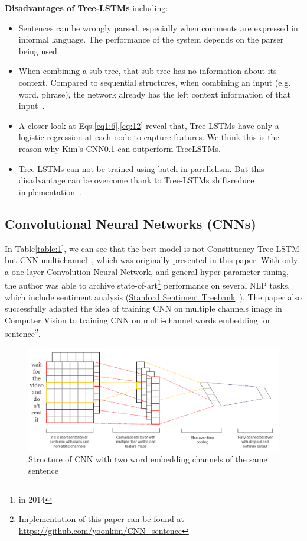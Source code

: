 \textbf{Disadvantages of Tree-LSTMs} including:\label{treelstm-drawback}
\begin{itemize}
\item Sentences can be wrongly parsed, especially when comments are expressed in informal language.
The performance of the system depends on the parser being used.
\item When combining a sub-tree, that sub-tree has no information about its context. 
Compared to sequential structures, when combining an input (e.g. word, phrase), the network already has the left context information of that input~\cite{shift-reduce}.
\item A closer look at Eqs.\eqref{eq1:6},\eqref{eq:12} reveal that, Tree-LSTMs have only a logistic regression at each node to capture features.
We think this is the reason why Kim's CNN\ref{kim-cnn} can outperform TreeLSTMs.  
\item Tree-LSTMs can not be trained using batch in parallelism. But this disadvantage can be overcome thank to Tree-LSTMs shift-reduce implementation~\cite{shift-reduce}.
\end{itemize}


\subsection{Convolutional Neural Networks (CNNs)}\label{kim-cnn}
In Table\ref{table:1}, we can see that the best model is not Constituency Tree-LSTM but CNN-multichannel~\cite{KimCNN}, which was originally presented in this paper. 
With only a one-layer \hyperref[sec:cnn]{Convolution Neural Network}, and general hyper-parameter tuning, the author was able to archive state-of-art\footnote{in 2014} performance on several NLP tasks, which include sentiment analysis (\hyperref[sec:sst]{Stanford Sentiment Treebank}~\cite{socher2013recursive}). 
The paper also successfully adapted the idea of training CNN on multiple channels image in Computer Vision to training CNN on multi-channel words embedding for sentence\footnote{Implementation of this paper can be found at \url{https://github.com/yoonkim/CNN\_sentence}}.

\begin{figure}[H]
    \centering
    \includegraphics[scale=0.33]{figure/sentencecnn}
    \caption[CNN with two embedding channel]{Structure of CNN with two word embedding channels of the same sentence}
    \label{fig:multi-cnn}
\end{figure}

